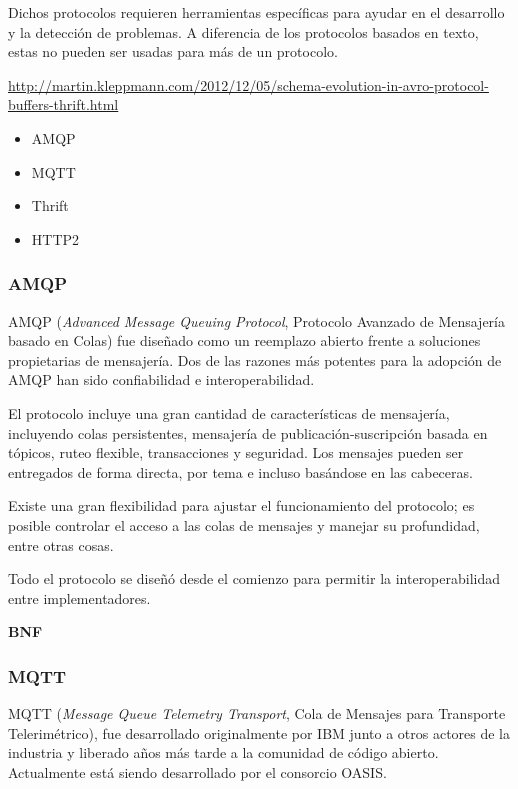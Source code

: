 Dichos protocolos requieren herramientas específicas para ayudar en el desarrollo y la detección de problemas. A diferencia de los protocolos basados en texto, estas no pueden ser usadas para más de un protocolo.

\url{http://martin.kleppmann.com/2012/12/05/schema-evolution-in-avro-protocol-buffers-thrift.html}

\begin{itemize}
  \item AMQP
  \item MQTT
  \item Thrift
  \item HTTP2
\end{itemize}

\subsubsection{AMQP}
AMQP (\textit{Advanced Message Queuing Protocol}, Protocolo Avanzado de Mensajería basado en Colas) fue diseñado como un reemplazo abierto frente a soluciones propietarias de mensajería. Dos de las razones más potentes para la adopción de AMQP han sido confiabilidad e interoperabilidad.

El protocolo incluye una gran cantidad de características de mensajería, incluyendo colas persistentes, mensajería de publicación-suscripción basada en tópicos, ruteo flexible, transacciones y seguridad. Los mensajes pueden ser entregados de forma directa, por tema e incluso basándose en las cabeceras.

Existe una gran flexibilidad para ajustar el funcionamiento del protocolo; es posible controlar el acceso a las colas de mensajes y manejar su profundidad, entre otras cosas.

Todo el protocolo se diseñó desde el comienzo para permitir la interoperabilidad entre implementadores.

\textbf{BNF}



\subsubsection{MQTT}
MQTT (\textit{Message Queue Telemetry Transport}, Cola de Mensajes para Transporte Telerimétrico), fue desarrollado originalmente por IBM junto a otros actores de la industria y liberado años más tarde a la comunidad de código abierto. Actualmente está siendo desarrollado por el consorcio OASIS.

